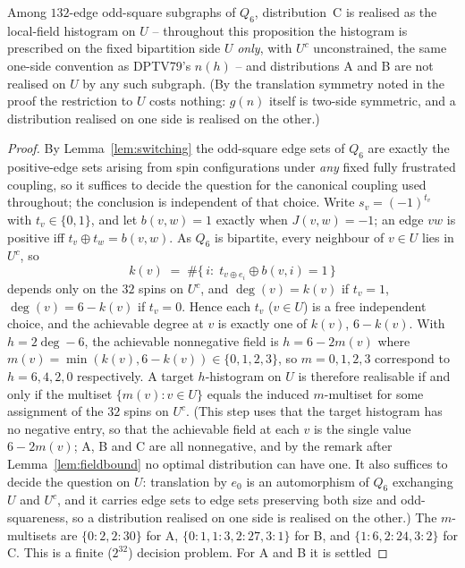 \documentclass[12pt]{article}
\begin{document}
\begin{proposition}\label{prop:q6realizability}
Among $132$-edge odd-square subgraphs of $Q_6$, distribution~C is realised as
the local-field histogram on $U$ -- throughout this proposition the histogram
is prescribed on the fixed bipartition side $U$ \emph{only}, with $U^{c}$
unconstrained, the same one-side convention as DPTV79's $n(h)$ -- and
distributions A and B are not realised on $U$ by any such subgraph. (By the
translation symmetry noted in the proof the restriction to $U$ costs nothing:
$g(n)$ itself is two-side symmetric, and a distribution realised on one side
is realised on the other.)
\end{proposition}
\begin{proof}
By Lemma~\ref{lem:switching} the odd-square edge sets of $Q_6$ are exactly the
positive-edge sets arising from spin configurations under \emph{any} fixed fully
frustrated coupling, so it suffices to decide the question for the canonical
coupling used throughout; the conclusion is independent of that choice.
Write $s_v=(-1)^{t_v}$ with $t_v\in\{0,1\}$, and let $b(v,w)=1$ exactly when
$J(v,w)=-1$; an edge $vw$ is positive iff $t_v\oplus t_w=b(v,w)$. As $Q_6$ is
bipartite, every neighbour of $v\in U$ lies in $U^{c}$, so
\[
k(v)\;=\;\#\{\,i:\;t_{v\oplus e_i}\oplus b(v,i)=1\,\}
\]
depends only on the $32$ spins on $U^{c}$, and
$\deg(v)=k(v)$ if $t_v=1$, $\deg(v)=6-k(v)$ if $t_v=0$. Hence each $t_v$
($v\in U$) is a free independent choice, and the achievable degree at $v$ is
exactly one of $k(v)$, $6-k(v)$. With $h=2\deg-6$, the achievable nonnegative
field is $h=6-2m(v)$ where $m(v)=\min(k(v),6-k(v))\in\{0,1,2,3\}$, so
$m=0,1,2,3$ correspond to $h=6,4,2,0$ respectively. A target $h$-histogram on
$U$ is therefore realisable if and only if the multiset $\{m(v):v\in U\}$ equals
the induced $m$-multiset for some assignment of the $32$ spins on $U^{c}$.
(This step uses that the target histogram has no negative entry, so that the
achievable field at each $v$ is the single value $6-2m(v)$; A, B and C are all
nonnegative, and by the remark after Lemma~\ref{lem:fieldbound} no optimal
distribution can have one. It also suffices to decide the question on $U$: translation by $e_0$ is an
automorphism of $Q_6$ exchanging $U$ and $U^{c}$, and it carries edge sets to
edge sets preserving both size and odd-squareness, so a distribution realised
on one side is realised on the other.) The
$m$-multisets are $\{0{:}2,2{:}30\}$ for A, $\{0{:}1,1{:}3,2{:}27,3{:}1\}$ for
B, and $\{1{:}6,2{:}24,3{:}2\}$ for C. This is a finite ($2^{32}$) decision problem. For A and B it is settled

\end{proof}
\end{document}
